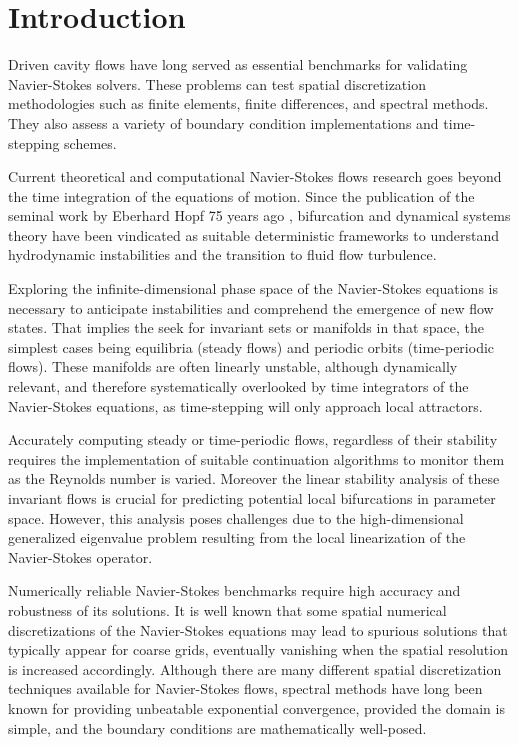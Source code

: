 
\section{Introduction} \label{sec:intro}

Driven cavity flows have long served as essential benchmarks for validating
Navier-Stokes solvers. These problems can test spatial discretization
methodologies such as finite elements, finite differences, and spectral
methods. They also assess a variety of boundary condition implementations and
time-stepping schemes.

Current theoretical and computational Navier-Stokes flows research goes beyond
the time integration of the equations of motion. Since the publication of the
seminal work by Eberhard Hopf 75 years ago \citep{hopf1948}, bifurcation and
dynamical systems theory have been vindicated as suitable deterministic
frameworks to understand hydrodynamic instabilities and the transition to fluid
flow turbulence.

Exploring the infinite-dimensional phase space of the Navier-Stokes equations
is necessary to anticipate instabilities and comprehend the emergence of new
flow states. That implies the seek for invariant sets or manifolds in that
space, the simplest cases being equilibria (steady flows) and periodic orbits
(time-periodic flows). These manifolds are often linearly unstable, although
dynamically relevant, and therefore systematically overlooked by time
integrators of the Navier-Stokes equations, as time-stepping will only approach
local attractors.

Accurately computing steady or time-periodic flows, regardless of their
stability requires the implementation of suitable continuation algorithms
\citep{kuznetsov2004} to monitor them as the Reynolds number is varied.
Moreover the linear stability analysis of these invariant flows is crucial for
predicting potential local bifurcations in parameter space. However, this
analysis poses challenges due to the high-dimensional generalized eigenvalue
problem resulting from the local linearization of the Navier-Stokes operator.

Numerically reliable Navier-Stokes benchmarks require high accuracy and
robustness of its solutions. It is well known that some spatial numerical
discretizations of the Navier-Stokes equations may lead to spurious solutions
that typically appear for coarse grids, eventually vanishing when the spatial
resolution is increased accordingly. Although there are many different spatial
discretization techniques available for Navier-Stokes flows, spectral methods
have long been known for providing unbeatable exponential convergence, provided
the domain is simple, and the boundary conditions are mathematically
well-posed.


